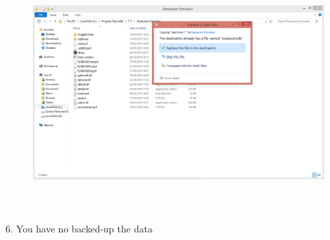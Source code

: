 \begin{figure}[H]
    \includegraphics[height = 9cm]{./Manual/images/restore3} 
    \caption{} \label{fig:hamaerraor3}
\end{figure}

6. You have no backed-up the data

